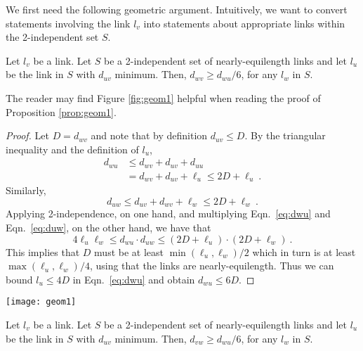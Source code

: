 \documentclass[11pt]{amsart}
\begin{document}
We first need the following geometric argument.
Intuitively, we want to convert statements involving the link $l_v$ 
into statements about appropriate links within the 2-independent set $S$.

\begin{proposition}
Let $l_v$ be a link.  Let $S$ be a 2-independent set of
nearly-equilength links and let $l_u$ be the link in $S$ with $d_{uv}$
minimum. Then, $d_{wv}\geq d_{wu}/6$, for any $l_w$ in $S$.
\label{prop:geom1}
\end{proposition}
The reader may find Figure \ref{fig:geom1} helpful when reading the proof of Proposition \ref{prop:geom1}.
\begin{proof}
Let $D = d_{wv}$ and note that by definition $d_{uv} \le D$.
By the triangular inequality and the definition of $l_u$, 
\begin{align}
 d_{wu} &\le d_{wv} + d_{uv} + d_{uu}
 \nonumber\\
 & = d_{wv} + d_{uv} + \ell_u 
       \le 2 D + \ell_u\ . 
\label{eq:dwu}
\end{align}
Similarly, 
\begin{equation}
 d_{uw} \le d_{uv} + d_{wv} + \ell_w \le 2 D + \ell_w \ .
\label{eq:duw}
\end{equation}
Applying 2-independence, on one hand, and multiplying Eqn.\ \ref{eq:dwu} and Eqn.\ \ref{eq:duw}, on the other hand, we have that
\[ 4 \ell_u \ell_w \le d_{wu} \cdot d_{uw} \leq (2D + \ell_u) \cdot (2 D + \ell_w) \ . \]
This implies that $D$ must be at least $\min(\ell_u, \ell_w)/2$ which in turn is at least $\max(\ell_u, \ell_w)/4$, using that the links are nearly-equilength.
Thus we can bound $l_u\leq 4D$ in Eqn.\ \ref{eq:dwu} and obtain $d_{wu}\leq 6D$.
\end{proof}
\begin{figure*}[ht]
	\begin{center}
		\texttt{[image: geom1]}
	\end{center}
	\caption{Displays links $l_u,l_w$ and $l_w$ as used in the proofs of Propositions \ref{prop:geom1} and \ref{prop:geom2}. The distances $d_{wv}$ and $d_{wu}$ that are related to each other in the Proposition's statement are represented by red dotted lines. The gray dashed lines mark distances $d_{uw}$ and $d_{uv}$ that are used in the proofs as well.}\label{fig:geom1}
\end{figure*}

\begin{proposition}
Let $l_v$ be a link.  Let $S$ be a 2-independent set of
nearly-equilength links and let $l_u$ be the link in $S$ with $d_{uv}$
minimum. Then, $d_{vw}\geq d_{wu}/6$, for any $l_w$ in $S$.
\label{prop:geom2}
\end{proposition}
\end{document}
